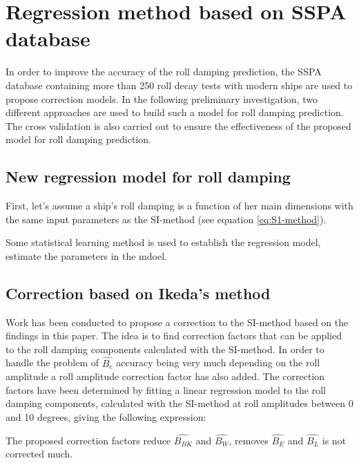 \section{Regression method based on SSPA database}
\label{se:correction_SI_method}
In order to improve the accuracy of the roll damping prediction, the SSPA database containing more than 250 roll decay tests with modern ships are used to propose correction models. In the following preliminary investigation, two different approaches are used to build such a model for roll damping prediction. The cross validation is also carried out to ensure the effectiveness of the proposed model for roll damping prediction.

\subsection{New regression model for roll damping}
First, let's assume a ship's roll damping is a function of her main dimensions with the same input parameters as the SI-method (see equation \ref{eq:S1-method}). 

Some statistical learning method is used to establish the regression model, 
estimate the parameters in the mdoel. 



\subsection{Correction based on Ikeda's method}
Work has been conducted to propose a correction to the SI-method based on the findings in this paper. The idea is to find correction factors that can be applied to the roll damping components calculated with the SI-method. In order to handle the problem of $\hat{B_e}$ accuracy being very much depending on the roll amplitude a roll amplitude correction factor has also added. The correction factors have been determined by fitting a linear regression model to the roll damping components, calculated with the SI-method at roll amplitudes between 0 and 10 degrees, giving the following expression: 

The proposed correction factors reduce $\hat{B_{BK}}$ and $\hat{B_{W}}$, removes $\hat{B_{E}}$ and $\hat{B_{L}}$ is not corrected much.


